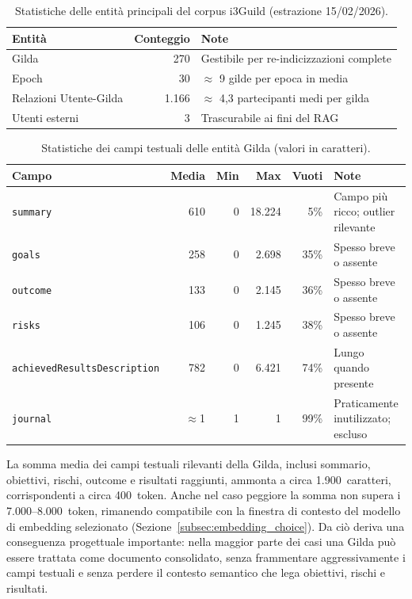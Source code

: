 \begin{table}[ht]
  \centering
  \caption{Statistiche delle entità principali del corpus i3Guild
    (estrazione 15/02/2026).}
  \label{tab:entity_stats}
  \small
  \begin{tabular}{lrp{7cm}}
    \toprule
    \textbf{Entità} & \textbf{Conteggio} & \textbf{Note} \\
    \midrule
    Gilda & 270 & Gestibile per re-indicizzazioni complete \\
    Epoch & 30 & $\approx$ 9 gilde per epoca in media \\
    Relazioni Utente-Gilda & 1.166 & $\approx$ 4,3 partecipanti medi per gilda \\
    Utenti esterni & 3 & Trascurabile ai fini del RAG \\
    \bottomrule
  \end{tabular}
\end{table}

\begin{table}[ht]
  \centering
  \caption{Statistiche dei campi testuali delle entità Gilda (valori in
    caratteri).}
  \label{tab:field_stats}
  \small
  \begin{tabular}{lrrrrl}
    \toprule
    \textbf{Campo} & \textbf{Media} & \textbf{Min} & \textbf{Max} &
      \textbf{Vuoti} & \textbf{Note} \\
    \midrule
    \texttt{summary} & 610 & 0 & 18.224 & 5\% & Campo più ricco; outlier
      rilevante \\
    \texttt{goals} & 258 & 0 & 2.698 & 35\% & Spesso breve o assente \\
    \texttt{outcome} & 133 & 0 & 2.145 & 36\% & Spesso breve o assente \\
    \texttt{risks} & 106 & 0 & 1.245 & 38\% & Spesso breve o assente \\
    \texttt{achievedResultsDescription} & 782 & 0 & 6.421 & 74\% & Lungo quando
      presente \\
    \texttt{journal} & $\approx$1 & 1 & 1 & 99\% & Praticamente inutilizzato;
      escluso \\
    \bottomrule
  \end{tabular}
\end{table}

\noindent La somma media dei campi testuali rilevanti della Gilda, inclusi
sommario, obiettivi, rischi, outcome e risultati raggiunti, ammonta a circa
1.900~caratteri,
corrispondenti a circa 400~token. Anche nel caso peggiore la somma non supera
i 7.000--8.000~token, rimanendo compatibile con la finestra di contesto del
modello di embedding selezionato (Sezione~\ref{subsec:embedding_choice}).
Da ciò deriva una conseguenza progettuale importante: nella maggior parte dei
casi una Gilda può essere trattata come documento consolidato, senza frammentare
aggressivamente i campi testuali e senza perdere il contesto semantico che lega
obiettivi, rischi e risultati.

